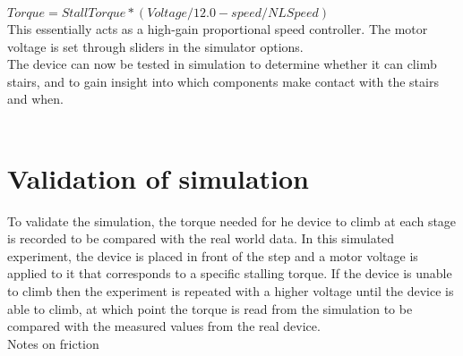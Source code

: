 $Torque = StallTorque*(Voltage/12.0-speed/NLSpeed)$\\

This essentially acts as a high-gain proportional speed controller. The motor voltage is set through sliders in the simulator options. \\
The device can now be tested in simulation to determine whether it can climb stairs, and to gain insight into which components make contact with the stairs and when.\\
\\
\section{Validation of simulation}
To validate the simulation, the torque needed for he device to climb at each stage is recorded to be compared with the real world data. In this simulated experiment, the device is placed in front of the step and a motor voltage is applied to it that corresponds to a specific stalling torque. If the device is unable to climb then the experiment is repeated with a higher voltage until the device is able to climb, at which point the torque is read from the simulation to be compared with the measured values from the real device.\\


Notes on friction\\
